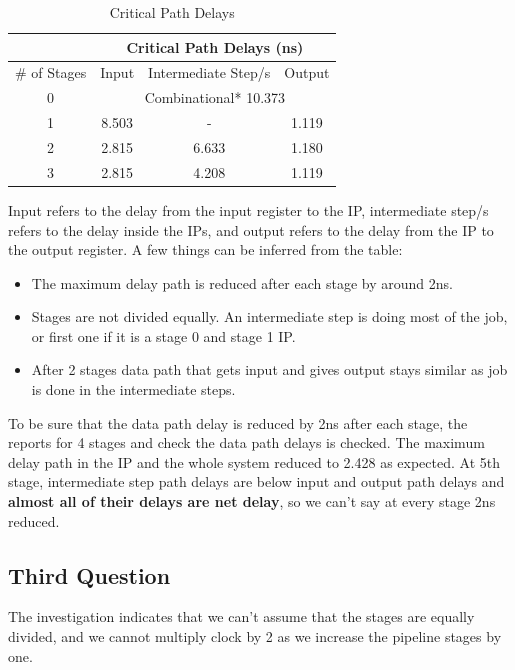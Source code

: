 \documentclass{report}
\begin{document}
\begin{table}[h!]
    \centering
    \begin{tabular}{c|c|c|c}
    \toprule
    & \multicolumn{3}{c}{Critical Path Delays (ns)} \\
    \midrule
    \# of Stages  & Input & Intermediate Step/s & Output \\
    \midrule
    0 & \multicolumn{3}{c}{Combinational* \hspace{30pt} 10.373} \\
    \midrule
    1 & 8.503 & - & 1.119 \\
    \midrule
    2 & 2.815 & 6.633 & 1.180 \\
    \midrule
    3 & 2.815 & 4.208 & 1.119 \\
    \bottomrule
    \end{tabular}
    \caption{Critical Path Delays}
    \label{tab:critical_path_delays}
    \end{table}
Input refers to the delay from the input register to the IP, intermediate step/s refers to the delay inside the IPs, and output refers to the delay from the IP to the output register.
A few things can be inferred from the table:
\begin{itemize}
    \item The maximum delay path is reduced after each stage by around 2ns.
    \item Stages are not divided equally. An intermediate step is doing most of the job, or first one if it is a stage 0 and stage 1 IP.
    \item After 2 stages data path that gets input and gives output stays similar as job is done in the intermediate steps. 
\end{itemize}

To be sure that the data path delay is reduced by 2ns after each stage, the reports for 4 stages and check the data path delays is checked. The maximum delay path in the IP and the whole system reduced to 2.428 as expected. At 5th stage, intermediate step path delays are below input and output path delays and \textbf{almost all of their delays are net delay}, so we can't say at every stage 2ns reduced.

\subsection{Third Question}
The investigation indicates that we can't assume that the stages are equally divided, and we cannot multiply clock by 2 as we increase the pipeline stages by one.
\end{document}
